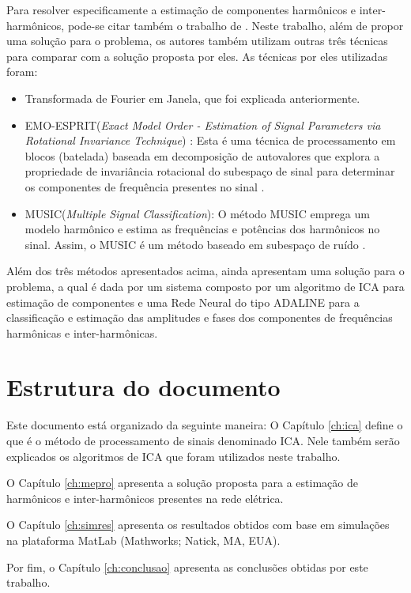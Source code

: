 \documentclass[a4paper,12pt]{monografia}
\theoremstyle{plain}
\theoremstyle{definition}
\theoremstyle{remark}
\begin{document}
Para resolver especificamente a estimação de componentes harmônicos e inter-harmônicos, pode-se citar também o trabalho de \cite{liu2016resolution}. Neste trabalho, além de propor uma solução para o problema, os autores também utilizam outras três técnicas para comparar com a solução proposta por eles. As técnicas por eles utilizadas foram: 
 \begin{itemize}
   \item Transformada de Fourier em Janela, que foi explicada anteriormente.
   \item EMO-ESPRIT(\textit{Exact Model Order - Estimation of Signal Parameters via Rotational Invariance Technique}) : Esta é uma técnica de processamento em blocos (batelada) baseada em decomposição de autovalores que explora a propriedade de invariância rotacional do subespaço de sinal para determinar os componentes de frequência presentes no sinal \cite{jain2012exact}. 
   \item MUSIC(\textit{Multiple Signal Classification}): O método MUSIC emprega um modelo harmônico e estima as frequências e potências dos harmônicos no sinal. Assim, o MUSIC é um método baseado em subespaço de ruído \cite{bollen2006signal}. 
 \end{itemize}
 
 Além dos três métodos apresentados acima, \cite{liu2016resolution} ainda apresentam uma solução para o problema, a qual é dada por um sistema composto por um algoritmo de ICA para estimação de componentes e uma Rede Neural do tipo ADALINE para a classificação e estimação das amplitudes e fases dos componentes de frequências harmônicas e inter-harmônicas. 

\section{Estrutura do documento}
\label{ch:estrutura}

Este documento está organizado da seguinte maneira: O Capítulo \ref{ch:ica} define o que é o método de processamento de sinais denominado ICA. Nele também serão explicados os algoritmos de ICA que foram utilizados neste trabalho.

O Capítulo \ref{ch:mepro} apresenta a solução proposta para a estimação de harmônicos e inter-harmônicos presentes na rede elétrica. 

O Capítulo \ref{ch:simres} apresenta os resultados obtidos com base em simulações na plataforma MatLab (Mathworks; Natick, MA, EUA).

Por fim, o Capítulo \ref{ch:conclusao} apresenta as conclusões obtidas por este trabalho. 
\end{document}
